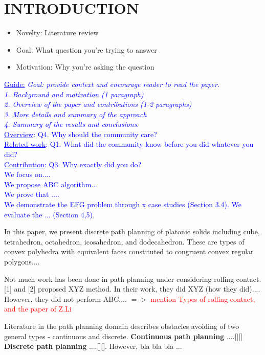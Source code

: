 
\section{INTRODUCTION}
\begin{itemize}
\color{red}
\item Novelty: Literature review
\item Goal: What question you're trying to answer
\item Motivation: Why you're asking the question
\end{itemize}

\textcolor{blue}{
\uline{Guide:} \textit{Goal: provide context and encourage reader to read the paper.\\
1. Background and motivation (1 paragraph)\\
2. Overview of the paper and contributions (1-2 paragraphs)\\
3. More details and summary of the approach\\
4. Summary of the results and conclusions}.\\
\noindent\uline{Overview}: Q4. Why should the community care?\\
\noindent\uline{Related work}: Q1. What did the community know before you did whatever you did?\\
\noindent\uline{Contribution}: Q3. Why exactly did you do?\\
We focus on....\\
We propose ABC algorithm...\\
We prove that ....\\
We demonstrate the EFG problem through x case studies (Section 3.4). We evaluate the ... (Section 4,5).\\
}

In this paper, we present discrete path planning of platonic solids including cube, tetrahedron, octahedron, icosahedron, and dodecahedron. These are types of convex polyhedra with equivalent faces constituted to congruent convex regular polygons....

Not much work has been done in path planning under considering rolling contact. [1] and [2] proposed XYZ method. In their work, they did XYZ (how they did).... However, they did not perform ABC.... $=>$ \textcolor{red}{mention Types of rolling contact, and the paper of Z.Li}

Literature in the path planning domain describes obstacles avoiding of two general types - continuous and discrete. \textbf{Continuous path planning} ....[][] \textbf{Discrete path planning} ....[][]. However, bla bla bla ...


